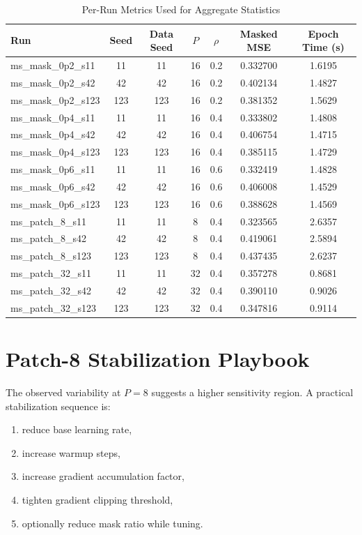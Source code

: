 \documentclass[conference]{IEEEtran}
\begin{document}
\begin{table}[t]
\caption{Per-Run Metrics Used for Aggregate Statistics}
\label{tab:run_matrix}
\centering
\scriptsize
\begin{tabular}{lcccccc}
\toprule
Run & Seed & Data Seed & $P$ & $\rho$ & Masked MSE & Epoch Time (s) \\
\midrule
ms\_mask\_0p2\_s11  & 11  & 11  & 16 & 0.2 & 0.332700 & 1.6195 \\
ms\_mask\_0p2\_s42  & 42  & 42  & 16 & 0.2 & 0.402134 & 1.4827 \\
ms\_mask\_0p2\_s123 & 123 & 123 & 16 & 0.2 & 0.381352 & 1.5629 \\
ms\_mask\_0p4\_s11  & 11  & 11  & 16 & 0.4 & 0.333802 & 1.4808 \\
ms\_mask\_0p4\_s42  & 42  & 42  & 16 & 0.4 & 0.406754 & 1.4715 \\
ms\_mask\_0p4\_s123 & 123 & 123 & 16 & 0.4 & 0.385115 & 1.4729 \\
ms\_mask\_0p6\_s11  & 11  & 11  & 16 & 0.6 & 0.332419 & 1.4828 \\
ms\_mask\_0p6\_s42  & 42  & 42  & 16 & 0.6 & 0.406008 & 1.4529 \\
ms\_mask\_0p6\_s123 & 123 & 123 & 16 & 0.6 & 0.388628 & 1.4569 \\
ms\_patch\_8\_s11   & 11  & 11  & 8  & 0.4 & 0.323565 & 2.6357 \\
ms\_patch\_8\_s42   & 42  & 42  & 8  & 0.4 & 0.419061 & 2.5894 \\
ms\_patch\_8\_s123  & 123 & 123 & 8  & 0.4 & 0.437435 & 2.6237 \\
ms\_patch\_32\_s11  & 11  & 11  & 32 & 0.4 & 0.357278 & 0.8681 \\
ms\_patch\_32\_s42  & 42  & 42  & 32 & 0.4 & 0.390110 & 0.9026 \\
ms\_patch\_32\_s123 & 123 & 123 & 32 & 0.4 & 0.347816 & 0.9114 \\
\bottomrule
\end{tabular}
\end{table}

\section{Patch-8 Stabilization Playbook}
The observed variability at $P=8$ suggests a higher sensitivity region. A practical stabilization sequence is:
\begin{enumerate}
    \item reduce base learning rate,
    \item increase warmup steps,
    \item increase gradient accumulation factor,
    \item tighten gradient clipping threshold,
    \item optionally reduce mask ratio while tuning.
\end{enumerate}
\end{document}

